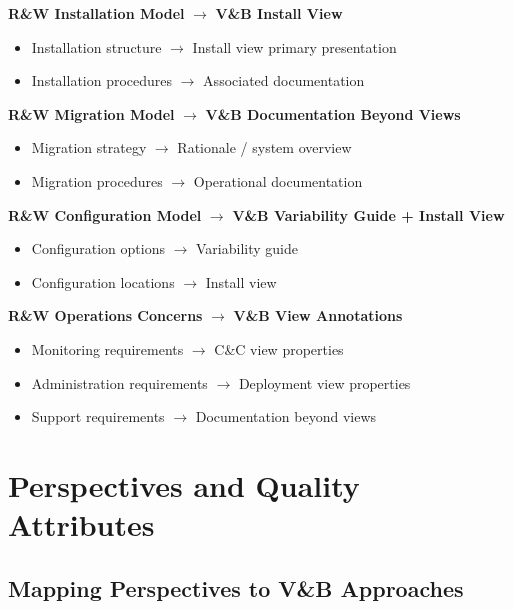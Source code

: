 \documentclass[11pt]{article}
\begin{document}
\begin{mappingbox}

\textbf{R\&W Installation Model} $\rightarrow$ \textbf{V\&B Install View}
\begin{itemize}[nosep]
    \item Installation structure $\rightarrow$ Install view primary presentation
    \item Installation procedures $\rightarrow$ Associated documentation
\end{itemize}

\textbf{R\&W Migration Model} $\rightarrow$ \textbf{V\&B Documentation Beyond Views}
\begin{itemize}[nosep]
    \item Migration strategy $\rightarrow$ Rationale / system overview
    \item Migration procedures $\rightarrow$ Operational documentation
\end{itemize}

\textbf{R\&W Configuration Model} $\rightarrow$ \textbf{V\&B Variability Guide + Install View}
\begin{itemize}[nosep]
    \item Configuration options $\rightarrow$ Variability guide
    \item Configuration locations $\rightarrow$ Install view
\end{itemize}

\textbf{R\&W Operations Concerns} $\rightarrow$ \textbf{V\&B View Annotations}
\begin{itemize}[nosep]
    \item Monitoring requirements $\rightarrow$ C\&C view properties
    \item Administration requirements $\rightarrow$ Deployment view properties
    \item Support requirements $\rightarrow$ Documentation beyond views
\end{itemize}
\end{mappingbox}

\section{Perspectives and Quality Attributes}

\subsection{Mapping Perspectives to V\&B Approaches}
\end{document}
